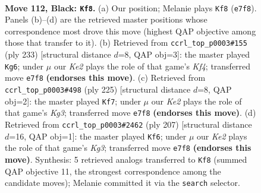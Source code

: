 \documentclass[11pt]{article}
\begin{document}
\clearpage

\begin{figure}[p]\centering
\begin{subfigure}{0.46\textwidth}\centering
\resizebox{\linewidth}{!}{%
\newchessgame
\chessboard[
  setfen={8/4k3/4p3/4P3/5PR1/8/3R1K2/7r b - - 10 112},
  showmover=false,
  pgfstyle=straightmove, color=movearrow, markmove={e7-f8}
]}
\caption{}
\end{subfigure}\hfill
\begin{subfigure}{0.46\textwidth}\centering
\resizebox{\linewidth}{!}{%
\newchessgame
\chessboard[
  setfen={8/r7/8/5k2/5p2/5P2/6P1/3R2K1 b - - 42 117},
  showmover=false,
  pgfstyle=straightmove, color=movearrow, markmove={f5-g6}
]}
\caption{}
\end{subfigure}
\\[4pt]
\begin{subfigure}{0.46\textwidth}\centering
\resizebox{\linewidth}{!}{%
\newchessgame
\chessboard[
  setfen={8/8/6k1/6p1/6P1/1R3K1P/8/r7 b - - 65 113},
  showmover=false,
  pgfstyle=straightmove, color=movearrow, markmove={g6-f7}
]}
\caption{}
\end{subfigure}\hfill
\begin{subfigure}{0.46\textwidth}\centering
\resizebox{\linewidth}{!}{%
\newchessgame
\chessboard[
  setfen={8/8/6kp/R7/5P2/6PK/8/2r5 b - - 24 104},
  showmover=false,
  pgfstyle=straightmove, color=movearrow, markmove={g6-f6}
]}
\caption{}
\end{subfigure}
\caption{\textbf{Move 112, Black: \texttt{Kf8}.} (a) Our position; Melanie plays \texttt{Kf8} (\texttt{e7f8}). Panels (b)--(d) are the retrieved master positions whose correspondence most drove this move (highest QAP objective among those that transfer to it). (b) Retrieved from \texttt{ccrl\_top\_p0003\#155} (ply 233) [structural distance $d$=8, QAP obj=3]: the master played \texttt{Kg6}; under $\mu$ our \emph{Ke2} plays the role of that game's \emph{Kf4}; transferred move \texttt{e7f8} \textbf{(endorses this move)}. (c) Retrieved from \texttt{ccrl\_top\_p0003\#498} (ply 225) [structural distance $d$=8, QAP obj=2]: the master played \texttt{Kf7}; under $\mu$ our \emph{Ke2} plays the role of that game's \emph{Kg3}; transferred move \texttt{e7f8} \textbf{(endorses this move)}. (d) Retrieved from \texttt{ccrl\_top\_p0003\#2462} (ply 207) [structural distance $d$=16, QAP obj=1]: the master played \texttt{Kf6}; under $\mu$ our \emph{Ke2} plays the role of that game's \emph{Kg3}; transferred move \texttt{e7f8} \textbf{(endorses this move)}. Synthesis: 5 retrieved analogs transferred to \texttt{Kf8} (summed QAP objective 11, the strongest correspondence among the candidate moves); Melanie committed it via the \texttt{search} selector.}
\label{fig:thought-m223}
\end{figure}
\end{document}
